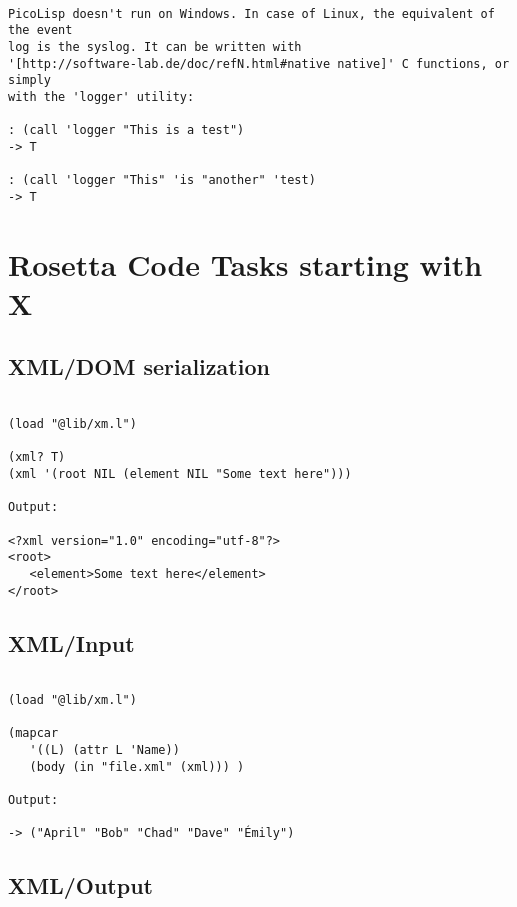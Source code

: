 \begin{verbatim}

PicoLisp doesn't run on Windows. In case of Linux, the equivalent of the event
log is the syslog. It can be written with
'[http://software-lab.de/doc/refN.html#native native]' C functions, or simply
with the 'logger' utility:

: (call 'logger "This is a test")
-> T

: (call 'logger "This" 'is "another" 'test)
-> T

\end{verbatim}

\chapter{Rosetta Code Tasks starting with X}

\section*{XML/DOM serialization}

\begin{verbatim}

(load "@lib/xm.l")

(xml? T)
(xml '(root NIL (element NIL "Some text here")))

Output:

<?xml version="1.0" encoding="utf-8"?>
<root>
   <element>Some text here</element>
</root>

\end{verbatim}

\section*{XML/Input}

\begin{verbatim}

(load "@lib/xm.l")

(mapcar
   '((L) (attr L 'Name))
   (body (in "file.xml" (xml))) )

Output:

-> ("April" "Bob" "Chad" "Dave" "Émily")

\end{verbatim}

\section*{XML/Output}

